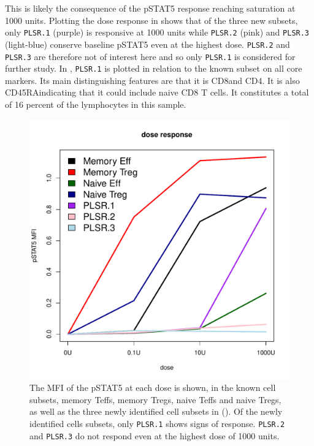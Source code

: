 This is likely the consequence of the pSTAT5 response reaching saturation at 1000 units.
Plotting the dose response in  shows that of the three new subsets, only \texttt{PLSR.1} (purple) is responsive at 1000 units while \texttt{PLSR.2} (pink) and \texttt{PLSR.3} (light-blue) conserve baseline pSTAT5 even at the highest dose.
\texttt{PLSR.2} and \texttt{PLSR.3} are therefore not of interest here and so only \texttt{PLSR.1} is considered for further study.
In , \texttt{PLSR.1} is plotted in relation to the known subset on all core markers.
Its main distinguishing features are that it is CD8\positive and CD4\negative.
It is also CD45RA\positive indicating that it could include naive CD8 T cells.
It constitutes a total of 16 percent of the lymphocytes in this sample.
\begin{figure}
\centering
\includegraphics[scale=.4]{figures/plsr-lymphocytes-dose-response}
{
The MFI of the pSTAT5 at each dose is shown, in the known cell subsets, memory Teffs, memory Tregs, naive Teffs and naive Tregs, as well as the three newly identified cell subsets in ().
Of the newly identified cells subsets, only \texttt{PLSR.1} shows signs of response.
\texttt{PLSR.2} and \texttt{PLSR.3} do not respond even at the highest dose of 1000 units.
}
\end{figure}

